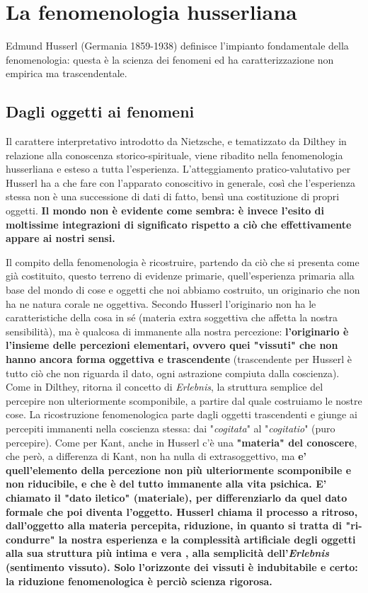 \section{La fenomenologia husserliana}

Edmund Husserl (Germania 1859-1938) definisce
l'impianto fondamentale della fenomenologia:
questa è la scienza dei fenomeni ed ha
caratterizzazione non empirica ma trascendentale.

\subsection{Dagli oggetti ai fenomeni}


Il carattere interpretativo introdotto da Nietzsche,
e tematizzato da Dilthey in relazione
alla conoscenza storico-spirituale, viene
ribadito nella fenomenologia husserliana e
esteso a tutta l'esperienza.
L'atteggiamento pratico-valutativo per Husserl
ha a che fare con l'apparato conoscitivo in
generale, così che l'esperienza stessa non è
una successione di dati di fatto, bensì una
costituzione di propri oggetti.
\textbf{Il mondo non è evidente come sembra: è invece
l'esito di moltissime integrazioni di significato
rispetto a ciò che effettivamente appare ai
nostri sensi.}

 Il compito della fenomenologia è
ricostruire, partendo da ciò che si presenta come
già costituito, questo terreno di evidenze
primarie, quell'esperienza primaria alla base
del mondo di cose e oggetti che noi abbiamo
costruito, un originario che non ha ne natura
corale ne oggettiva.
Secondo Husserl l'originario non ha le caratteristiche
della cosa in sé (materia extra soggettiva che
affetta la nostra sensibilità), ma è qualcosa
di immanente alla nostra percezione: \textbf{l'originario
è l'insieme delle percezioni elementari, ovvero quei
"vissuti" che non hanno ancora forma oggettiva e
trascendente} (trascendente per Husserl è tutto ciò che non riguarda il dato, ogni astrazione compiuta dalla coscienza).
Come in Dilthey, ritorna il concetto di \textit{Erlebnis},
la struttura semplice del percepire non ulteriormente scomponibile, a partire dal quale costruiamo
le nostre cose. La ricostruzione fenomenologica
parte dagli oggetti trascendenti e giunge
ai percepiti immanenti nella coscienza stessa:
dai "\textit{cogitata}" al "\textit{cogitatio}" (puro percepire).
Come per Kant, anche in Husserl c'è una
\textbf{"materia" del conoscere}, che però, a differenza di
Kant, non ha nulla di extrasoggettivo, ma \textbf{e' quell'elemento della percezione non più ulteriormente
scomponibile e non riducibile, e che è del
tutto immanente alla vita psichica. E'
chiamato il "dato iletico" (materiale), per
differenziarlo da quel dato formale che poi diventa l'oggetto.
Husserl chiama il processo a ritroso, dall'oggetto alla materia percepita, riduzione,
in quanto si tratta di "ri-condurre" la
nostra esperienza e la complessità artificiale
degli oggetti alla sua struttura più intima
e vera , alla semplicità dell'\textit{Erlebnis}
(sentimento vissuto).
Solo l'orizzonte dei vissuti è indubitabile e
certo: la riduzione fenomenologica è
perciò scienza rigorosa.}



